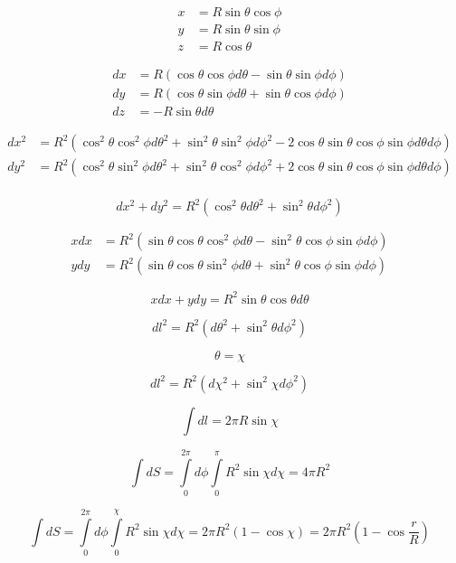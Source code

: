 \documentclass[14pt]{extarticle}
\title{}
\author{}
\begin{document}
\begin{align*}\label{}
    x &= R\sin\theta\cos\phi \\
    y &= R\sin\theta\sin\phi \\
    z &= R\cos\theta
\end{align*}

\begin{align*}\label{}
    dx &= R(\cos\theta\cos\phi d\theta - \sin\theta\sin\phi d\phi )\\
    dy &= R(\cos\theta\sin\phi d\theta + \sin\theta\cos\phi d\phi ) \\
    dz &= -R\sin\theta d\theta
\end{align*}

\begin{align*}\label{}
    dx^2 &= R^2( \cos^2\theta\cos^2\phi d\theta^2 +  \sin^2\theta\sin^2\phi d\phi^2 - 2\cos\theta\sin\theta\cos\phi\sin\phi d\theta d\phi )\\
    dy^2 &= R^2( \cos^2\theta\sin^2\phi d\theta^2 +  \sin^2\theta\cos^2\phi d\phi^2 + 2\cos\theta\sin\theta\cos\phi\sin\phi  d\theta d\phi)\\
\end{align*}

\begin{equation*}\label{}
    dx^2 + dy^2 = R^2(\cos^2\theta d\theta^2 + \sin^2\theta d\phi^2)
\end{equation*}

\begin{align*}\label{}
    xdx &= R^2(\sin\theta\cos\theta\cos^2\phi d\theta - \sin^2\theta\cos\phi\sin\phi d\phi) \\
    ydy &= R^2(\sin\theta\cos\theta\sin^2\phi d\theta + \sin^2\theta\cos\phi\sin\phi d\phi)
\end{align*}

\begin{equation*}\label{}
    xdx + ydy = R^2\sin\theta\cos\theta d\theta
\end{equation*}

\begin{equation*}\label{}
    dl^2 = R^2( d\theta^2 + \sin^2\theta d\phi^2 )
\end{equation*}

\begin{equation*}\label{}
    \theta = \chi
\end{equation*}

\begin{equation*}\label{}
    dl^2 = R^2( d\chi^2 + \sin^2\chi d\phi^2 )
\end{equation*}

\begin{equation*}\label{}
    \int dl = 2\pi R\sin\chi
\end{equation*}


\begin{equation*}\label{}
    \int dS = \int\limits_0^{2\pi} d\phi \int\limits_0^{\pi} R^2\sin\chi d\chi = 4\pi R^2
\end{equation*}

\begin{equation*}\label{}
    \int dS = \int\limits_0^{2\pi} d\phi \int\limits_0^{\chi} R^2\sin\chi d\chi = 2\pi R^2 (1- \cos\chi) = 2\pi R^2(1 - \cos\frac{r}{R})
\end{equation*}
\end{document}

